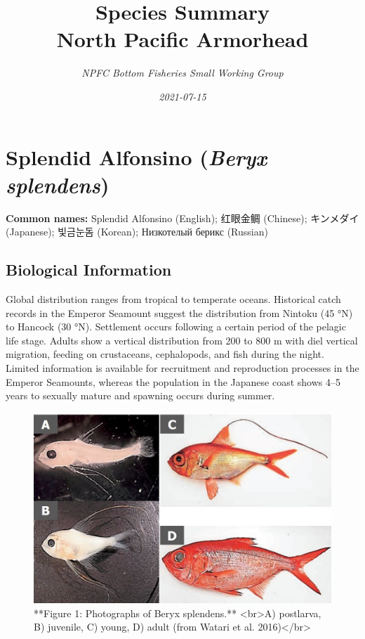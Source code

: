 \documentclass[
]{article}
\title{Species Summary\\
North Pacific Armorhead}
\author{\emph{NPFC Bottom Fisheries Small Working Group}}
\date{\emph{2021-07-15}}
\begin{document}
\maketitle

\hypertarget{splendid-alfonsino-beryx-splendens}{%
\section{\texorpdfstring{Splendid Alfonsino (\emph{Beryx
splendens})}{Splendid Alfonsino (Beryx splendens)}}\label{splendid-alfonsino-beryx-splendens}}

\textbf{Common names:} Splendid Alfonsino (English); 红眼金鲷 (Chinese);
キンメダイ (Japanese); 빛금눈돔 (Korean); Низкотелый берикс (Russian)

\hypertarget{biological-information}{%
\subsection{Biological Information}\label{biological-information}}

Global distribution ranges from tropical to temperate oceans. Historical
catch records in the Emperor Seamount suggest the distribution from
Nintoku (45 °N) to Hancock (30 °N). Settlement occurs following a
certain period of the pelagic life stage. Adults show a vertical
distribution from 200 to 800 m with diel vertical migration, feeding on
crustaceans, cephalopods, and fish during the night. Limited information
is available for recruitment and reproduction processes in the Emperor
Seamounts, whereas the population in the Japanese coast shows 4--5 years
to sexually mature and spawning occurs during summer.

\begin{figure}

{\centering \includegraphics[width=0.7\linewidth,height=0.7\textheight]{Figures/SA} 

}

\caption{**Figure 1: Photographs of Beryx splendens.** <br>A) postlarva, B) juvenile, C) young, D) adult (from Watari et al. 2016)</br>}\label{fig:picture}
\end{figure}
\end{document}
